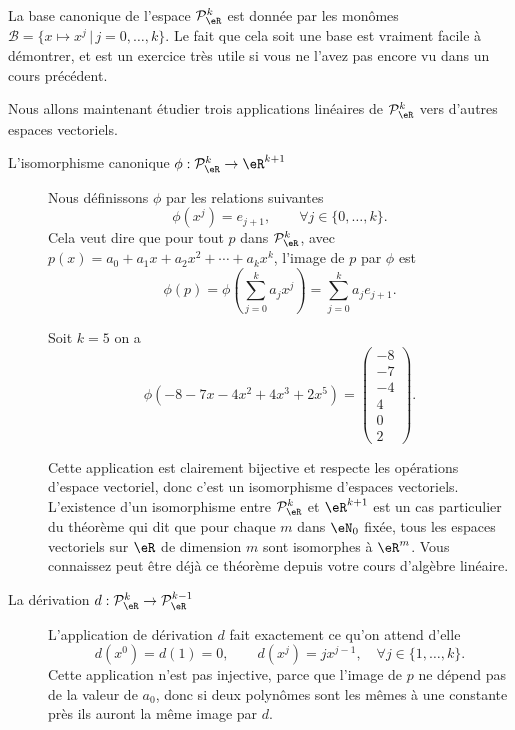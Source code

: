 La base canonique de l'espace \( \mathcal{P}_\eR^k\) est donnée par les monômes \( \mathcal{B}=\{x\mapsto x^j \,|\, j=0, \ldots, k\}\). Le fait que cela soit une base est vraiment facile à démontrer, et est un exercice très utile si vous ne l'avez pas encore vu dans un cours précédent.

Nous allons maintenant étudier trois applications linéaires de \( \mathcal{P}_\eR^k\) vers d'autres espaces vectoriels.
\begin{description}
	\item[L'isomorphisme canonique  \( \phi:\mathcal{P}_\eR^k \to\eR^{k+1}\)] Nous définissons \( \phi\) par les relations suivantes
		\[
			\phi(x^j)=e_{j+1}, \qquad \forall j\in\{0,\dots, k\}.
		\]
		Cela veut dire que pour tout \( p\) dans \( \mathcal{P}_\eR^k\), avec \( p(x)=a_0+a_1 x +a_2 x^2 + \cdots+a_k x^k\), l'image de \( p\) par \( \phi\) est
		\[
			\phi(p)=\phi\left(\sum_{j=0}^k a_j x^j\right)=\sum_{j=0}^k a_j e_{j+1}.
		\]
		\begin{example} Soit \( k=5\) on a
			\begin{equation}
				\phi(-8-7x-4x^2+4x^3+2x^5)=
				\begin{pmatrix}
					-8 \\
					-7 \\
					-4 \\
					4  \\
					0  \\
					2
				\end{pmatrix}.
			\end{equation}
		\end{example}

		Cette application est clairement bijective et respecte les opérations d'espace vectoriel, donc c'est un isomorphisme d'espaces vectoriels. L'existence d'un isomorphisme entre \( \mathcal{P}_\eR^k\)  et \( \eR^{k+1}\) est un cas particulier du théorème qui dit que  pour chaque \( m\) dans \( \eN_0\) fixée, tous les espaces vectoriels sur \( \eR\) de dimension \( m\) sont isomorphes à \( \eR^m\). Vous connaissez peut être déjà ce théorème depuis votre cours d'algèbre linéaire.
	\item[La dérivation \( d: \mathcal{P}_\eR^k \to \mathcal{P}_\eR^{k-1}\)] L'application de dérivation \( d\) fait exactement ce qu'on attend d'elle
		\[
			d(x^0)=d(1)=0, \qquad d(x^j)=j x^{j-1}, \quad \forall j\in\{1,\dots, k\}.
		\]
		Cette application n'est pas injective, parce que l'image de \( p\) ne dépend pas de la valeur de \( a_0\), donc si deux polynômes sont les mêmes à une constante près ils auront la même image par \( d\).


\end{description}
